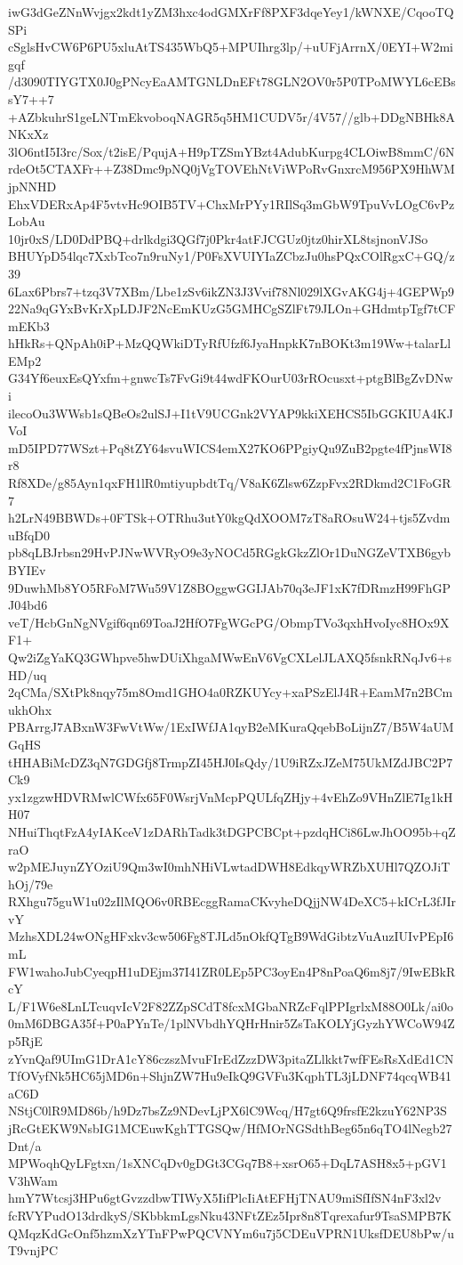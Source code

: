 iwG3dGeZNnWvjgx2kdt1yZM3hxc4odGMXrFf8PXF3dqeYey1/kWNXE/CqooTQSPi
cSglsHvCW6P6PU5xluAtTS435WbQ5+MPUIhrg3lp/+uUFjArrnX/0EYI+W2migqf
/d3090TIYGTX0J0gPNcyEaAMTGNLDnEFt78GLN2OV0r5P0TPoMWYL6cEBssY7++7
+AZbkuhrS1geLNTmEkvoboqNAGR5q5HM1CUDV5r/4V57//glb+DDgNBHk8ANKxXz
3lO6ntI5I3rc/Sox/t2isE/PqujA+H9pTZSmYBzt4AdubKurpg4CLOiwB8mmC/6N
rdeOt5CTAXFr++Z38Dmc9pNQ0jVgTOVEhNtViWPoRvGnxrcM956PX9HhWMjpNNHD
EhxVDERxAp4F5vtvHc9OIB5TV+ChxMrPYy1RIlSq3mGbW9TpuVvLOgC6vPzLobAu
10jr0xS/LD0DdPBQ+drlkdgi3QGf7j0Pkr4atFJCGUz0jtz0hirXL8tsjnonVJSo
BHUYpD54lqc7XxbTco7n9ruNy1/P0FsXVUIYIaZCbzJu0hsPQxCOlRgxC+GQ/z39
6Lax6Pbrs7+tzq3V7XBm/Lbe1zSv6ikZN3J3Vvif78Nl029lXGvAKG4j+4GEPWp9
22Na9qGYxBvKrXpLDJF2NcEmKUzG5GMHCgSZlFt79JLOn+GHdmtpTgf7tCFmEKb3
hHkRs+QNpAh0iP+MzQQWkiDTyRfUfzf6JyaHnpkK7nBOKt3m19Ww+talarLlEMp2
G34Yf6euxEsQYxfm+gnwcTs7FvGi9t44wdFKOurU03rROcusxt+ptgBlBgZvDNwi
ilecoOu3WWsb1sQBeOs2ulSJ+I1tV9UCGnk2VYAP9kkiXEHCS5IbGGKIUA4KJVoI
mD5IPD77WSzt+Pq8tZY64svuWICS4emX27KO6PPgiyQu9ZuB2pgte4fPjnsWI8r8
Rf8XDe/g85Ayn1qxFH1lR0mtiyupbdtTq/V8aK6Zlsw6ZzpFvx2RDkmd2C1FoGR7
h2LrN49BBWDs+0FTSk+OTRhu3utY0kgQdXOOM7zT8aROsuW24+tjs5ZvdmuBfqD0
pb8qLBJrbsn29HvPJNwWVRyO9e3yNOCd5RGgkGkzZlOr1DuNGZeVTXB6gybBYIEv
9DuwhMb8YO5RFoM7Wu59V1Z8BOggwGGIJAb70q3eJF1xK7fDRmzH99FhGPJ04bd6
veT/HcbGnNgNVgif6qn69ToaJ2HfO7FgWGcPG/ObmpTVo3qxhHvoIyc8HOx9XF1+
Qw2iZgYaKQ3GWhpve5hwDUiXhgaMWwEnV6VgCXLelJLAXQ5fsnkRNqJv6+sHD/uq
2qCMa/SXtPk8nqy75m8Omd1GHO4a0RZKUYcy+xaPSzElJ4R+EamM7n2BCmukhOhx
PBArrgJ7ABxnW3FwVtWw/1ExIWfJA1qyB2eMKuraQqebBoLijnZ7/B5W4aUMGqHS
tHHABiMcDZ3qN7GDGfj8TrmpZI45HJ0IsQdy/1U9iRZxJZeM75UkMZdJBC2P7Ck9
yx1zgzwHDVRMwlCWfx65F0WsrjVnMcpPQULfqZHjy+4vEhZo9VHnZlE7Ig1kHH07
NHuiThqtFzA4yIAKceV1zDARhTadk3tDGPCBCpt+pzdqHCi86LwJhOO95b+qZraO
w2pMEJuynZYOziU9Qm3wI0mhNHiVLwtadDWH8EdkqyWRZbXUHl7QZOJiThOj/79e
RXhgu75guW1u02zIlMQO6v0RBEcggRamaCKvyheDQjjNW4DeXC5+kICrL3fJIrvY
MzhsXDL24wONgHFxkv3cw506Fg8TJLd5nOkfQTgB9WdGibtzVuAuzIUIvPEpI6mL
FW1wahoJubCyeqpH1uDEjm37I41ZR0LEp5PC3oyEn4P8nPoaQ6m8j7/9IwEBkRcY
L/F1W6e8LnLTcuqvIcV2F82ZZpSCdT8fcxMGbaNRZcFqlPPIgrlxM88O0Lk/ai0o
0mM6DBGA35f+P0aPYnTe/1plNVbdhYQHrHnir5ZsTaKOLYjGyzhYWCoW94Zp5RjE
zYvnQaf9UImG1DrA1cY86czszMvuFIrEdZzzDW3pitaZLlkkt7wfFEsRsXdEd1CN
TfOVyfNk5HC65jMD6n+ShjnZW7Hu9eIkQ9GVFu3KqphTL3jLDNF74qcqWB41aC6D
NStjC0lR9MD86b/h9Dz7bsZz9NDevLjPX6lC9Wcq/H7gt6Q9frsfE2kzuY62NP3S
jRcGtEKW9NsbIG1MCEuwKghTTGSQw/HfMOrNGSdthBeg65n6qTO4lNegb27Dnt/a
MPWoqhQyLFgtxn/1sXNCqDv0gDGt3CGq7B8+xsrO65+DqL7ASH8x5+pGV1V3hWam
hmY7Wtcsj3HPu6gtGvzzdbwTIWyX5IifPlcIiAtEFHjTNAU9miSfIfSN4nF3xl2v
fcRVYPudO13drdkyS/SKbbkmLgsNku43NFtZEz5Ipr8n8Tqrexafur9TsaSMPB7K
QMqzKdGcOnf5hzmXzYTnFPwPQCVNYm6u7j5CDEuVPRN1UksfDEU8bPw/uT9vnjPC
